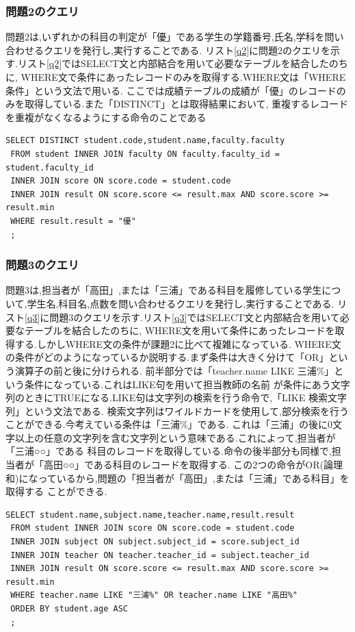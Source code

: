 \documentclass[a4j]{jarticle}
\begin{document}
    \subsubsection{問題2のクエリ}
    問題2は,いずれかの科目の判定が「優」である学生の学籍番号,氏名,学科を問い合わせるクエリを発行し,実行することである.
    リスト\ref{q2}に問題2のクエリを示す.リスト\ref{q2}ではSELECT文と内部結合を用いて必要なテーブルを結合したのちに,
    WHERE文で条件にあったレコードのみを取得する.WHERE文は「WHERE 条件」という文法で用いる.
    ここでは成績テーブルの成績が「優」のレコードのみを取得している.また「DISTINCT」とは取得結果において,
    重複するレコードを重複がなくなるようにする命令のことである
    \begin{lstlisting}[basicstyle=\ttfamily\footnotesize, frame=single,label=q2,caption=問題2のクエリ]
 SELECT DISTINCT student.code,student.name,faculty.faculty
 FROM student INNER JOIN faculty ON faculty.faculty_id = student.faculty_id 
 INNER JOIN score ON score.code = student.code
 INNER JOIN result ON score.score <= result.max AND score.score >= result.min
 WHERE result.result = "優"
 ;
    \end{lstlisting}


    \subsubsection{問題3のクエリ}
問題3は,担当者が「高田」,または「三浦」である科目を履修している学生について,学生名,科目名,点数を問い合わせるクエリを発行し,実行することである.
リスト\ref{q3}に問題3のクエリを示す.リスト\ref{q3}ではSELECT文と内部結合を用いて必要なテーブルを結合したのちに,
WHERE文を用いて条件にあったレコードを取得する.しかしWHERE文の条件が課題2に比べて複雑になっている.
WHERE文の条件がどのようになっているか説明する.まず条件は大きく分けて「OR」という演算子の前と後に分けられる.
前半部分では「teacher.name LIKE 三浦\%」という条件になっている.これはLIKE句を用いて担当教師の名前
が条件にあう文字列のときにTRUEになる.LIKE句は文字列の検索を行う命令で,「LIKE 検索文字列」という文法である.
検索文字列はワイルドカードを使用して,部分検索を行うことができる.今考えている条件は「三浦\%」である.
これは「三浦」の後に0文字以上の任意の文字列を含む文字列という意味である.これによって,担当者が「三浦○○」である
科目のレコードを取得している.命令の後半部分も同様で,担当者が「高田○○」である科目のレコードを取得する.
この2つの命令がOR(論理和)になっているから,問題の「担当者が「高田」,または「三浦」である科目」を取得する
ことができる.

\begin{lstlisting}[basicstyle=\ttfamily\footnotesize, frame=single,label=q3,caption=問題3のクエリ]
 SELECT student.name,subject.name,teacher.name,result.result
 FROM student INNER JOIN score ON score.code = student.code
 INNER JOIN subject ON subject.subject_id = score.subject_id 
 INNER JOIN teacher ON teacher.teacher_id = subject.teacher_id
 INNER JOIN result ON score.score <= result.max AND score.score >= result.min
 WHERE teacher.name LIKE "三浦%" OR teacher.name LIKE "高田%" 
 ORDER BY student.age ASC
 ;
     \end{lstlisting}
\end{document}
